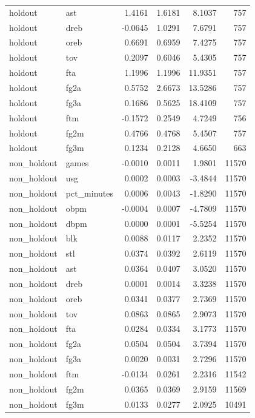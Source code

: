 \begin{table}
\begin{tabular}{llrrrr}
holdout & ast & 1.4161 & 1.6181 & 8.1037 & 757 \\
holdout & dreb & -0.0645 & 1.0291 & 7.6791 & 757 \\
holdout & oreb & 0.6691 & 0.6959 & 7.4275 & 757 \\
holdout & tov & 0.2097 & 0.6046 & 5.4305 & 757 \\
holdout & fta & 1.1996 & 1.1996 & 11.9351 & 757 \\
holdout & fg2a & 0.5752 & 2.6673 & 13.5286 & 757 \\
holdout & fg3a & 0.1686 & 0.5625 & 18.4109 & 757 \\
holdout & ftm & -0.1572 & 0.2549 & 4.7249 & 756 \\
holdout & fg2m & 0.4766 & 0.4768 & 5.4507 & 757 \\
holdout & fg3m & 0.1234 & 0.2128 & 4.6650 & 663 \\
non\_holdout & games & -0.0010 & 0.0011 & 1.9801 & 11570 \\
non\_holdout & usg & 0.0002 & 0.0003 & -3.4844 & 11570 \\
non\_holdout & pct\_minutes & 0.0006 & 0.0043 & -1.8290 & 11570 \\
non\_holdout & obpm & -0.0004 & 0.0007 & -4.7809 & 11570 \\
non\_holdout & dbpm & 0.0000 & 0.0001 & -5.5254 & 11570 \\
non\_holdout & blk & 0.0088 & 0.0117 & 2.2352 & 11570 \\
non\_holdout & stl & 0.0374 & 0.0392 & 2.6119 & 11570 \\
non\_holdout & ast & 0.0364 & 0.0407 & 3.0520 & 11570 \\
non\_holdout & dreb & 0.0001 & 0.0014 & 3.3238 & 11570 \\
non\_holdout & oreb & 0.0341 & 0.0377 & 2.7369 & 11570 \\
non\_holdout & tov & 0.0863 & 0.0865 & 2.9073 & 11570 \\
non\_holdout & fta & 0.0284 & 0.0334 & 3.1773 & 11570 \\
non\_holdout & fg2a & 0.0504 & 0.0504 & 3.7394 & 11570 \\
non\_holdout & fg3a & 0.0020 & 0.0031 & 2.7296 & 11570 \\
non\_holdout & ftm & -0.0134 & 0.0261 & 2.2316 & 11542 \\
non\_holdout & fg2m & 0.0365 & 0.0369 & 2.9159 & 11569 \\
non\_holdout & fg3m & 0.0133 & 0.0277 & 2.0925 & 10491 \\
\bottomrule
\end{tabular}
\end{table}
